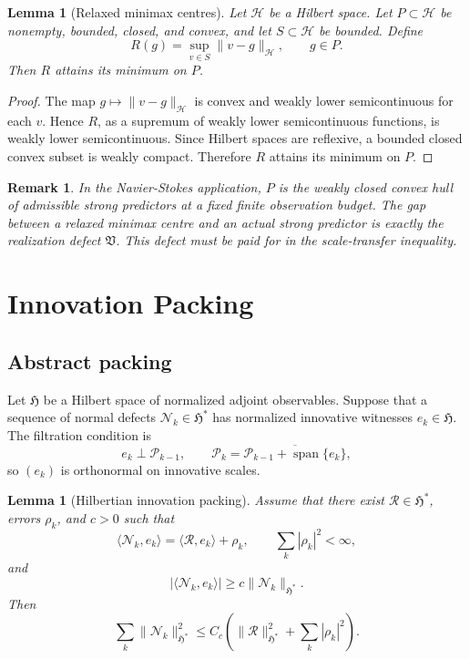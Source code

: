 \documentclass[11pt]{article}
\newtheorem{lemma}[theorem]{Lemma}
\newtheorem{remark}[theorem]{Remark}
\begin{document}
\begin{lemma}[Relaxed minimax centres]
Let \(\mathcal H\) be a Hilbert space. Let \(P\subset\mathcal H\) be nonempty, bounded, closed, and convex, and let \(S\subset\mathcal H\) be bounded. Define
\[
R(g)=\sup_{v\in S}\|v-g\|_{\mathcal H},
\qquad
g\in P.
\]
Then \(R\) attains its minimum on \(P\).
\end{lemma}

\begin{proof}
The map \(g\mapsto\|v-g\|_{\mathcal H}\) is convex and weakly lower semicontinuous for each \(v\). Hence \(R\), as a supremum of weakly lower semicontinuous functions, is weakly lower semicontinuous. Since Hilbert spaces are reflexive, a bounded closed convex subset is weakly compact. Therefore \(R\) attains its minimum on \(P\).
\end{proof}

\begin{remark}
In the Navier-Stokes application, \(P\) is the weakly closed convex hull of admissible strong predictors at a fixed finite observation budget. The gap between a relaxed minimax centre and an actual strong predictor is exactly the realization defect \(\mathfrak V\). This defect must be paid for in the scale-transfer inequality.
\end{remark}

\section{Innovation Packing}

\subsection{Abstract packing}

Let \(\mathfrak H\) be a Hilbert space of normalized adjoint observables. Suppose that a sequence of normal defects \(\mathcal N_k\in\mathfrak H^*\) has normalized innovative witnesses \(e_k\in\mathfrak H\). The filtration condition is
\[
e_k\perp \mathcal P_{k-1},
\qquad
\mathcal P_k=\overline{\mathcal P_{k-1}+\operatorname{span}\{e_k\}},
\]
so \((e_k)\) is orthonormal on innovative scales.

\begin{lemma}[Hilbertian innovation packing]
Assume that there exist \(\mathcal R\in\mathfrak H^*\), errors \(\rho_k\), and \(c>0\) such that
\[
\langle \mathcal N_k,e_k\rangle
=
\langle \mathcal R,e_k\rangle+\rho_k,
\qquad
\sum_k|\rho_k|^2<\infty,
\]
and
\[
|\langle \mathcal N_k,e_k\rangle|\ge c\|\mathcal N_k\|_{\mathfrak H^*}.
\]
Then
\[
\sum_k\|\mathcal N_k\|_{\mathfrak H^*}^2
\le
C_c\left(\|\mathcal R\|_{\mathfrak H^*}^2+\sum_k|\rho_k|^2\right).
\]
\end{lemma}
\end{document}
